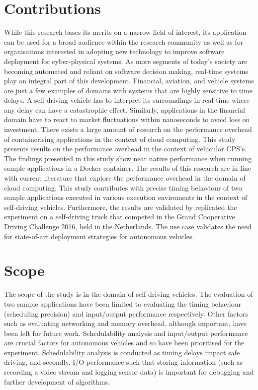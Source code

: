 \section{Contributions}

While this research bases its merits on a narrow field of interest, its application can be used for a broad audience within the research community as well as for organisations interested in adopting new technology to improve software deployment for cyber-physical systems. As more segments of today’s society are becoming automated and reliant on software decision making, real-time systems play an integral part of this development. Financial, aviation, and vehicle systems are just a few examples of domains with systems that are highly sensitive to time delays. A self-driving vehicle has to interpret its surroundings in real-time where any delay can have a catastrophic effect. Similarly, applications in the financial domain have to react to market fluctuations within nanoseconds to avoid loss on investment. There exists a large amount of research on the performance overhead of containerising applications in the context of cloud computing. This study presents results on the performance overhead in the context of vehicular CPS's. \\

The findings presented in this study show near native performance when running sample applications in a Docker container. The results of this research are in line with current literature that explore the performance overhead in the domain of cloud computing. This study contributes with precise timing behaviour of two sample applications executed in various execution enviroments in the context of self-driving vehicles. Furthermore, the results are validated by replicated the experiment on a self-driving truck that competed in the Grand Cooperative Driving Challenge 2016, held in the Netherlands. The use case validates the need for state-of-art deployment strategies for autonomous vehicles. 
\section{Scope}
The scope of the study is in the domain of self-driving vehicles. The evaluation of two sample applications have been limited to evaluating the timing behaviour (scheduling precision) and input/output performance respectively. Other factors such as evaluating networking and memory overhead, although important, have been left for future work. Schedulability analysis and input/output performance are crucial factors for autonomous vehicles and so have been prioritised for the experiment. Schedulability analysis is conducted as timing delays impact safe driving, and secondly, I/O performance such that storing information (such as recording a video stream and logging sensor data) is important for debugging and further development of algorithms. 

